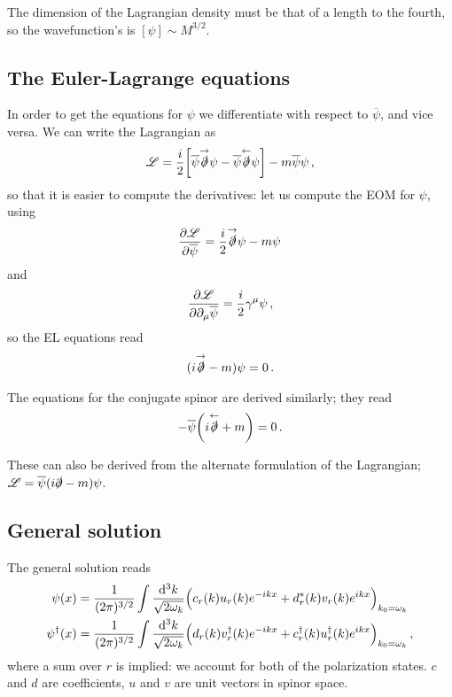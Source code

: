 \documentclass[main.tex]{subfiles}
\begin{document}
The dimension of the Lagrangian density must be that of a length to the fourth, so the wavefunction's is \([\psi ] \sim M^{3/2}\).

\subsection{The Euler-Lagrange equations}

In order to get the equations for \(\psi \) we differentiate with respect to \(\overline{\psi}\), and vice versa. We can write the Lagrangian as 
%
\begin{align}
\mathscr{L} = \frac{i}{2} \qty[ \overline{\psi} \overset{\rightarrow}{\slashed{\partial}} \psi - \overline{\psi} \overset{\leftarrow}{\slashed{\partial}} \psi  ] - m \overline{\psi} \psi 
\,,
\end{align}
%
so that it is easier to compute the derivatives: let us compute the EOM for \(\psi \), using 
%
\begin{align}
\pdv{\mathscr{L}}{\overline{\psi}} = \frac{i}{2} \overset{\rightarrow}{\slashed{\partial}} \psi - m \psi 
\,
\end{align}
%
and 
%
\begin{align}
\pdv{\mathscr{L}}{\partial_{\mu } \overline{\psi}}
= \frac{i}{2} \gamma^{\mu } \psi 
\,,
\end{align}
%
so the EL equations read 
%
\begin{align}
(i \overset{\rightarrow}{\slashed{\partial}} - m) \psi = 0
\,.
\end{align}

The equations for the conjugate spinor are derived similarly; they read 
%
\begin{align}
- \overline{\psi} \qty(i \overset{\leftarrow}{\slashed{\partial}} + m) = 0
\,.
\end{align}

\begin{claim}
These can also be derived from the alternate formulation of the Lagrangian; \(\mathscr{L} = \overline{\psi} (i \slashed{\partial} - m) \psi \). 
\end{claim}

\subsection{General solution}

The general solution reads 
%
\begin{align} \label{eq:dirac-general-solution}
\psi (x) &= \frac{1}{(2 \pi )^{3/2}}
\int \frac{ \dd[3]{k}}{\sqrt{2 \omega_{k}}}
\qty(c_r (k) u_r (k) e^{-ikx} + d^{*}_{r} (k) v_r (k) e^{ikx})_{k_0 = \omega_{k}}  \\
\psi ^\dag (x) &= \frac{1}{(2 \pi )^{3/2}}
\int \frac{ \dd[3]{k}}{\sqrt{2 \omega_{k}}}
\qty(d_r (k) v_r ^\dag (k) e^{-ikx} + c ^\dag_{r} (k) u_r ^\dag (k) e^{ikx})_{k_0 = \omega_{k}}  
\,,
\end{align}
%
where a sum over \(r\) is implied: we account for both of the polarization states. 
\(c\) and \(d\) are coefficients, \(u\) and \(v\) are unit vectors in spinor space.
\end{document}

